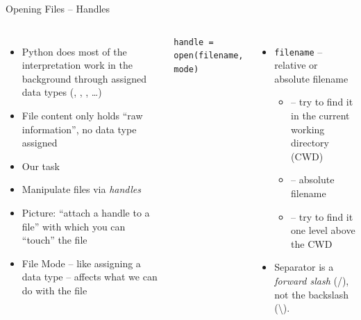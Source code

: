 \begin{frame}[fragile]{Opening Files -- Handles}
%
\vspace{-15pt}
\begin{columns}[t]
\begin{itemize}
\item Python does most of the interpretation work in the background through assigned data types (, , , \ldots)
\item File content only holds \enquote{raw information}, no data type assigned
\item[\Thus] Our task
\item Manipulate files via \emph{handles}
\item Picture: \enquote{attach a handle to a file} with which you can \enquote{touch} the file
\item File Mode -- like assigning a data type -- affects what we can do with the file
\end{itemize}
%
\begin{codebox}
\begin{verbatim}
handle = open(filename, mode)
\end{verbatim}
\end{codebox}
%
\begin{itemize}
\item \texttt{filename} -- relative or absolute filename
	\vspace{-12pt}
	\begin{itemize}
	\item {} -- try to find it in the current working directory (CWD)
	\item {} -- absolute filename
	\item {} -- try to find it one level above the CWD
	\end{itemize}
\item Separator is a \emph{forward slash} (/), not the backslash (\textbackslash).
\end{itemize}
\end{columns}
%
\end{frame}


